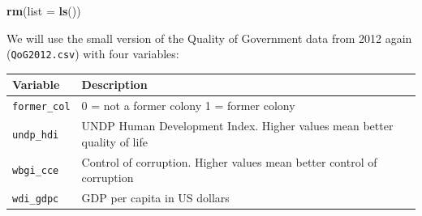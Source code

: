 \documentclass[]{article}
\newenvironment{Shaded}{\begin{snugshade}}{\end{snugshade}}
\newcommand{\DataTypeTok}[1]{\textcolor[rgb]{0.13,0.29,0.53}{#1}}
\newcommand{\KeywordTok}[1]{\textcolor[rgb]{0.13,0.29,0.53}{\textbf{#1}}}
\newcommand{\NormalTok}[1]{#1}
\begin{document}
\begin{Shaded}
\begin{Highlighting}[]
\KeywordTok{rm}\NormalTok{(}\DataTypeTok{list =} \KeywordTok{ls}\NormalTok{())}
\end{Highlighting}
\end{Shaded}

We will use the small version of the Quality of Government data from 2012 again (\texttt{QoG2012.csv}) with four variables:

\begin{longtable}[]{@{}ll@{}}
\toprule
\begin{minipage}[b]{0.17\columnwidth}\raggedright
Variable\strut
\end{minipage} & \begin{minipage}[b]{0.77\columnwidth}\raggedright
Description\strut
\end{minipage}\tabularnewline
\midrule
\endhead
\begin{minipage}[t]{0.17\columnwidth}\raggedright
\texttt{former\_col}\strut
\end{minipage} & \begin{minipage}[t]{0.77\columnwidth}\raggedright
0 = not a former colony 1 = former colony\strut
\end{minipage}\tabularnewline
\begin{minipage}[t]{0.17\columnwidth}\raggedright
\texttt{undp\_hdi}\strut
\end{minipage} & \begin{minipage}[t]{0.77\columnwidth}\raggedright
UNDP Human Development Index. Higher values mean better quality of life\strut
\end{minipage}\tabularnewline
\begin{minipage}[t]{0.17\columnwidth}\raggedright
\texttt{wbgi\_cce}\strut
\end{minipage} & \begin{minipage}[t]{0.77\columnwidth}\raggedright
Control of corruption. Higher values mean better control of corruption\strut
\end{minipage}\tabularnewline
\begin{minipage}[t]{0.17\columnwidth}\raggedright
\texttt{wdi\_gdpc}\strut
\end{minipage} & \begin{minipage}[t]{0.77\columnwidth}\raggedright
GDP per capita in US dollars\strut
\end{minipage}\tabularnewline
\bottomrule
\end{longtable}
\end{document}
